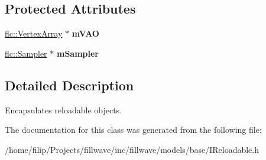 \subsection*{Protected Attributes}
\begin{DoxyCompactItemize}
\item 
\hyperlink{classflw_1_1flc_1_1VertexArray}{flc\+::\+Vertex\+Array} $\ast$ {\bfseries m\+V\+AO}\hypertarget{classflw_1_1flf_1_1IReloadable_a9aca34153ac7f3a633591234cd603e04}{}\label{classflw_1_1flf_1_1IReloadable_a9aca34153ac7f3a633591234cd603e04}

\item 
\hyperlink{classflw_1_1flc_1_1Sampler}{flc\+::\+Sampler} $\ast$ {\bfseries m\+Sampler}\hypertarget{classflw_1_1flf_1_1IReloadable_ad7e7e8c96385b0bc2f6c65e8a18c7806}{}\label{classflw_1_1flf_1_1IReloadable_ad7e7e8c96385b0bc2f6c65e8a18c7806}

\end{DoxyCompactItemize}


\subsection{Detailed Description}
Encapsulates reloadable objects. 

The documentation for this class was generated from the following file\+:\begin{DoxyCompactItemize}
\item 
/home/filip/\+Projects/fillwave/inc/fillwave/models/base/I\+Reloadable.\+h\end{DoxyCompactItemize}
